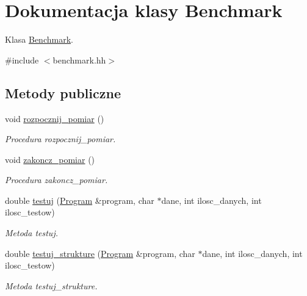 \hypertarget{class_benchmark}{\section{Dokumentacja klasy Benchmark}
\label{class_benchmark}
}


Klasa \hyperlink{class_benchmark}{Benchmark}.  




{\ttfamily \#include $<$benchmark.\-hh$>$}

\subsection*{Metody publiczne}
\begin{DoxyCompactItemize}
\item 
void \hyperlink{class_benchmark_a684ddcbdd22608838da1ad23f1fcc2ce}{rozpocznij\-\_\-pomiar} ()
\begin{DoxyCompactList}\small\item\em Procedura rozpocznij\-\_\-pomiar. \end{DoxyCompactList}\item 
void \hyperlink{class_benchmark_a3f4b4595a3d1145d238f5b3c8486d875}{zakoncz\-\_\-pomiar} ()
\begin{DoxyCompactList}\small\item\em Procedura zakoncz\-\_\-pomiar. \end{DoxyCompactList}\item 
double \hyperlink{class_benchmark_ad2f9d4a8ee5a33de5261c2b2eff3d87a}{testuj} (\hyperlink{class_program}{Program} \&program, char $\ast$dane, int ilosc\-\_\-danych, int ilosc\-\_\-testow)
\begin{DoxyCompactList}\small\item\em Metoda testuj. \end{DoxyCompactList}\item 
double \hyperlink{class_benchmark_ac8fa0356657b4a1ffd46df6ae7fd78d0}{testuj\-\_\-strukture} (\hyperlink{class_program}{Program} \&program, char $\ast$dane, int ilosc\-\_\-danych, int ilosc\-\_\-testow)
\begin{DoxyCompactList}\small\item\em Metoda testuj\-\_\-strukture. \end{DoxyCompactList}\end{DoxyCompactItemize}
